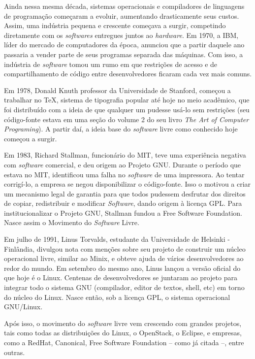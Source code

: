 \documentclass{classe_cn}                 %
\begin{document}
Ainda nessa mesma década, sistemas operacionais e compiladores de linguagens de programação começaram a evoluir, aumentando drasticamente seus custos. Assim, uma indústria pequena e crescente começava a surgir, competindo diretamente com os \textit{softwares} entregues juntos ao \textit{hardware}. Em 1970, a IBM, líder do mercado de computadores da época, anunciou que a partir daquele ano passaria a vender parte de seus programas separada das máquinas. Com isso, a indústria de \textit{software} tomou um rumo em que restrições de acesso e de compartilhamento de código entre desenvolvedores ficaram cada vez mais comuns.

Em 1978, Donald Knuth professor da Universidade de Stanford, começou a trabalhar no TeX, sistema de tipografia popular até hoje no meio acadêmico, que foi distribuído com a ideia de que qualquer um pudesse usá-lo sem restrições (seu código-fonte estava em uma seção do volume 2 do seu livro \textit{The Art of Computer Programing}). A partir daí, a ideia base do \textit{software} livre como conhecido hoje começou a surgir.

Em 1983, Richard Stallman, funcionário do MIT, teve uma experiência negativa com \textit{software} comercial, e deu origem ao Projeto GNU. Durante o período que estava no MIT, identificou uma falha no \textit{software} de uma impressora. Ao tentar corrigí-lo, a empresa se negou disponibilizar o código-fonte. Isso o motivou a criar um mecanismo legal de garantia para que todos pudessem desfrutar dos direitos de copiar, redistribuir e modificar \textit{Software}, dando origem à licença GPL. Para institucionalizar o Projeto GNU, Stallman fundou a Free Software Foundation. Nasce assim o Movimento do \textit{Software} Livre.

Em julho de 1991, Linus Torvalds, estudante da Universidade de Helsinki - Finlândia, divulgou nota com menções sobre seu projeto de construir um núcleo operacional livre, similar ao Minix, e obteve ajuda de vários desenvolvedores ao redor do mundo. Em setembro do mesmo ano, Linus lançou a versão oficial do que hoje é o Linux. Centenas de desenvolvedores se juntaram ao projeto para integrar todo o sistema GNU (compilador, editor de textos, shell, etc) em torno do núcleo do Linux. Nasce então, sob a licença GPL, o sistema operacional GNU/Linux.

Após isso, o movimento do \textit{software} livre vem crescendo com grandes projetos, tais como todas as distribuições do Linux, o OpenStack, o Eclipse, e empresas, como a RedHat, Canonical, Free Software Foundation -- como já citada --, entre outras.
\end{document}
